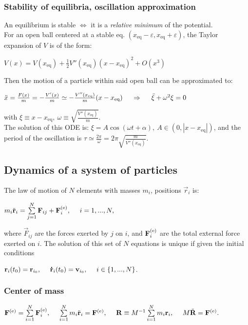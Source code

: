 \subsubsection*{Stability of equilibria, oscillation approximation}
An equilibrium is stable $\iff$ it is a \emph{relative minimum} of the potential.\\
For an open ball centered at a stable eq. $(x_{\text{eq}}-\varepsilon,x_{\text{eq}}+\varepsilon)$, the Taylor expansion  
of $V$ is of the form:\\
\centerline{$V(x)=V(x_{\text{eq}})+\frac{1}{2}V''(x_{\text{eq}})(x-x_{\text{eq}})^{2}+O(x^{3})$}
Then the motion of a particle within said open ball can be approximated to:
\centerline{$\ddot{x}=\frac{F(x)}{m}=-\frac{V'(x)}{m}\simeq -\frac{V''(x_{\text{eq}})}{m}(x-x_{\text{eq}})\ \ \ \ \then \ \ \ \ \ddot{\xi}+\omega^{2}\xi=0$}
with $\xi\equiv x-x_{\text{eq}},\ \omega\equiv\sqrt{\frac{V''(x_{\text{eq}})}{m}}$.\\
The solution of this ODE is: $\xi=A\cos{(\omega t+\alpha)},\ A\in(0,|x-x_{\text{eq}}|)$, and the period of the oscillation is $\tau\simeq \frac{2\pi}{\omega}=2\pi\sqrt{\frac{m}{V''(x_{\text{eq}})}}$.



\subsection{Dynamics of a system of particles}
The law of motion of $N$ elements with masses $m_{i}$, positions $\vec{r}_{i}$ is:\\
\centerline{$m_{i}\ddot{\vec{r}}_{i}=\sum\limits_{j=1}^{N}\vec{F}_{ij}+\vec{F}_{i}\ext,\ \ \ \ i=1,...,N,$}
where $\vec{F}_{ij}$ are the forces exerted by $j$ on $i$, and $\mathbf{F}_{i}^{\text{(e)}}$ are the total external force exerted on $i$.
The solution of this set of $N$ equations is unique if given the initial conditions\\
\centerline{$\vec{r}_{i}(t_{0})=\vec{r}_{i_{0}},\ \ \ \ \dotv{r}_{i}(t_{0})=\vec{v}_{i_{0}},\ \ \ \ i\in\{1,...,N\}$.}
\subsubsection*{Center of mass}
\centerline{$\vec{F}\ext=\sum\limits_{i=1}^{N}\vec{F}\i\ext,\ \ \ \ \sum\limits_{i=1}^{N}m\i\ddot{\vec{r}}\i=\vec{F}\ext,\ \ \ \ \vec{R}\equiv M^{-1}\sum\limits_{i=1}^{N}m\i\vec{r}\i,\ \ \ \ M\ddot{\vec{R}}=\vec{F}\ext.$}



